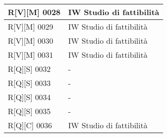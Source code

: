 \begin{table}
\begin{tabularx}{\textwidth}{lX}
    \hline
    R[V][M] 0028    & IW Studio di fattibilità  \\
    \hline
    R[V][M] 0029    & IW Studio di fattibilità  \\
    \hline
    R[V][M] 0030    & IW Studio di fattibilità  \\
    \hline
    R[V][M] 0031    & IW Studio di fattibilità  \\
    \hline
    R[Q][S] 0032    & -  \\
    \hline
    R[Q][S] 0033    & -  \\
    \hline
    R[Q][S] 0034    & -  \\
    \hline
    R[Q][S] 0035    & -  \\
    \hline
    R[Q][C] 0036    & IW Studio di fattibilità  \\
    \hline
    \end{tabularx}
    \end{table}%


